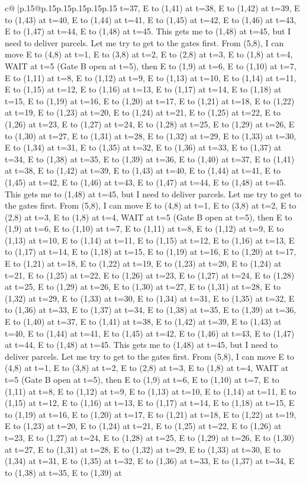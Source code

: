 \documentclass{article}
\begin{document}
{\begin{supertabular}{c@{$\;$}|p{.15\linewidth}@{}p{.15\linewidth}p{.15\linewidth}p{.15\linewidth}p{.15\linewidth}p{.15\linewidth}}
{{{t=37, E to (1,41) at t=38, E to (1,42) at t=39, E to (1,43) at t=40, E to (1,44) at t=41, E to (1,45) at t=42, E to (1,46) at t=43, E to (1,47) at t=44, E to (1,48) at t=45. This gets me to (1,48) at t=45, but I need to deliver parcels. Let me try to get to the gates first. From (5,8), I can move E to (4,8) at t=1, E to (3,8) at t=2, E to (2,8) at t=3, E to (1,8) at t=4, WAIT at t=5 (Gate B open at t=5), then E to (1,9) at t=6, E to (1,10) at t=7, E to (1,11) at t=8, E to (1,12) at t=9, E to (1,13) at t=10, E to (1,14) at t=11, E to (1,15) at t=12, E to (1,16) at t=13, E to (1,17) at t=14, E to (1,18) at t=15, E to (1,19) at t=16, E to (1,20) at t=17, E to (1,21) at t=18, E to (1,22) at t=19, E to (1,23) at t=20, E to (1,24) at t=21, E to (1,25) at t=22, E to (1,26) at t=23, E to (1,27) at t=24, E to (1,28) at t=25, E to (1,29) at t=26, E to (1,30) at t=27, E to (1,31) at t=28, E to (1,32) at t=29, E to (1,33) at t=30, E to (1,34) at t=31, E to (1,35) at t=32, E to (1,36) at t=33, E to (1,37) at t=34, E to (1,38) at t=35, E to (1,39) at t=36, E to (1,40) at t=37, E to (1,41) at t=38, E to (1,42) at t=39, E to (1,43) at t=40, E to (1,44) at t=41, E to (1,45) at t=42, E to (1,46) at t=43, E to (1,47) at t=44, E to (1,48) at t=45. This gets me to (1,48) at t=45, but I need to deliver parcels. Let me try to get to the gates first. From (5,8), I can move E to (4,8) at t=1, E to (3,8) at t=2, E to (2,8) at t=3, E to (1,8) at t=4, WAIT at t=5 (Gate B open at t=5), then E to (1,9) at t=6, E to (1,10) at t=7, E to (1,11) at t=8, E to (1,12) at t=9, E to (1,13) at t=10, E to (1,14) at t=11, E to (1,15) at t=12, E to (1,16) at t=13, E to (1,17) at t=14, E to (1,18) at t=15, E to (1,19) at t=16, E to (1,20) at t=17, E to (1,21) at t=18, E to (1,22) at t=19, E to (1,23) at t=20, E to (1,24) at t=21, E to (1,25) at t=22, E to (1,26) at t=23, E to (1,27) at t=24, E to (1,28) at t=25, E to (1,29) at t=26, E to (1,30) at t=27, E to (1,31) at t=28, E to (1,32) at t=29, E to (1,33) at t=30, E to (1,34) at t=31, E to (1,35) at t=32, E to (1,36) at t=33, E to (1,37) at t=34, E to (1,38) at t=35, E to (1,39) at t=36, E to (1,40) at t=37, E to (1,41) at t=38, E to (1,42) at t=39, E to (1,43) at t=40, E to (1,44) at t=41, E to (1,45) at t=42, E to (1,46) at t=43, E to (1,47) at t=44, E to (1,48) at t=45. This gets me to (1,48) at t=45, but I need to deliver parcels. Let me try to get to the gates first. From (5,8), I can move E to (4,8) at t=1, E to (3,8) at t=2, E to (2,8) at t=3, E to (1,8) at t=4, WAIT at t=5 (Gate B open at t=5), then E to (1,9) at t=6, E to (1,10) at t=7, E to (1,11) at t=8, E to (1,12) at t=9, E to (1,13) at t=10, E to (1,14) at t=11, E to (1,15) at t=12, E to (1,16) at t=13, E to (1,17) at t=14, E to (1,18) at t=15, E to (1,19) at t=16, E to (1,20) at t=17, E to (1,21) at t=18, E to (1,22) at t=19, E to (1,23) at t=20, E to (1,24) at t=21, E to (1,25) at t=22, E to (1,26) at t=23, E to (1,27) at t=24, E to (1,28) at t=25, E to (1,29) at t=26, E to (1,30) at t=27, E to (1,31) at t=28, E to (1,32) at t=29, E to (1,33) at t=30, E to (1,34) at t=31, E to (1,35) at t=32, E to (1,36) at t=33, E to (1,37) at t=34, E to (1,38) at t=35, E to (1,39) at }}}
\end{supertabular}}
\end{document}

